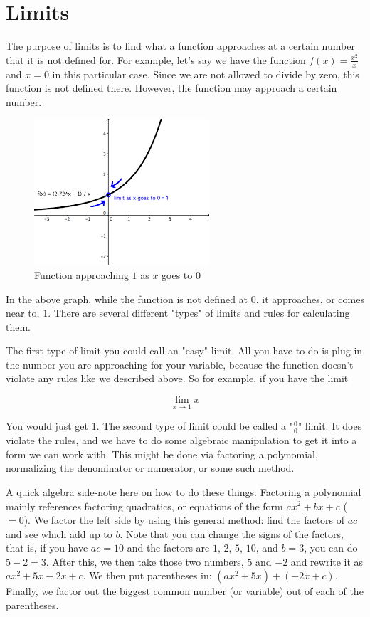 \documentclass[12pt]{article}
\begin{document}
\section{Limits}

The purpose of limits is to find what a function approaches at a certain number that it is not defined for. 
For example, let's say we have the function $f(x) = \frac{x^2}{x}$ and $x = 0$ in this particular case. 
Since we are not allowed to divide by zero, this function is not defined there. 
However, the function may approach a certain number.

\begin{figure}[H]
\caption{Function approaching $1$ as $x$ goes to $0$}
\includegraphics[scale=0.8]{images.png}
\end{figure}

In the above graph, while the function is not defined at $0$, it approaches, or comes near to, $1$. 
There are several different "types" of limits and rules for calculating them. 

The first type of limit you could call an "easy" limit. 
All you have to do is plug in the number you are approaching for your variable, because the function doesn't violate any rules like we described above. 
So for example, if you have the limit

\begin{equation*}
    \lim\limits_{x\rightarrow 1} x
\end{equation*}

You would just get 1. 
The second type of limit could be called a "$\frac{0}{0}$" limit. 
It does violate the rules, and we have to do some algebraic manipulation to get it into a form we can work with. 
This might be done via factoring a polynomial, normalizing the denominator or numerator, or some such method.

A quick algebra side-note here on how to do these things. 
Factoring a polynomial mainly references factoring quadratics, or equations of the form $ax^2 + bx + c$ ($=0$). 
We factor the left side by using this general method: find the factors of $ac$ and see which add up to $b$. 
Note that you can change the signs of the factors, that is, if you have $ac = 10$ and the factors are $1, \, 2, \, 5, \, 10$, and $b = 3$, you can do $5-2 = 3$. 
After this, we then take those two numbers, $5$ and $-2$ and rewrite it as $ax^2 + 5x -2x + c$. 
We then put parentheses in: $(ax^2 + 5x) + (-2x + c)$. 
Finally, we factor out the biggest common number (or variable) out of each of the parentheses.
\end{document}
